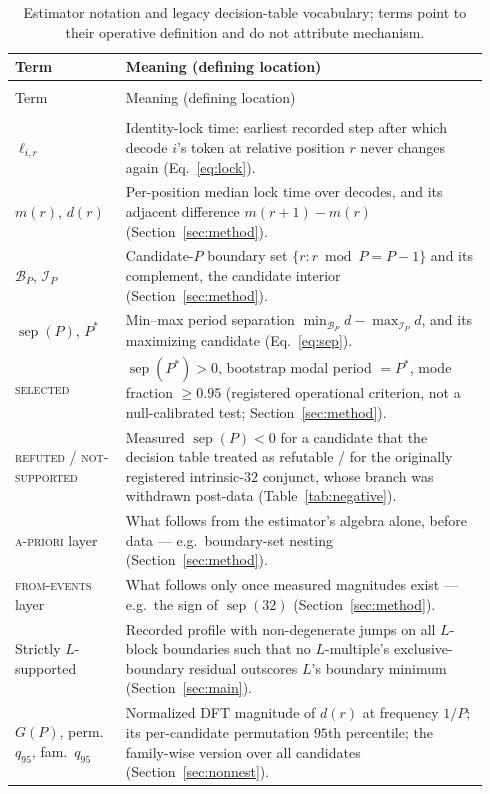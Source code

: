 \documentclass{article}
\begin{document}
\begingroup
\footnotesize
\setlength{\tabcolsep}{3pt}
\setlength{\LTpre}{3pt}
\setlength{\LTpost}{6pt}
\FloatBarrier
\begin{longtable}{@{}>{\raggedright\arraybackslash}p{0.22\linewidth}
                       >{\raggedright\arraybackslash}p{0.72\linewidth}@{}}
\caption{Estimator notation and legacy decision-table vocabulary; terms point to
their operative definition and do not attribute mechanism.}\label{tab:glossary}\\
\toprule
Term & Meaning (defining location) \\
\midrule
\endfirsthead
\multicolumn{2}{@{}l}{\footnotesize\itshape Table~\thetable{} continued}\\
\toprule
Term & Meaning (defining location) \\
\midrule
\endhead
\midrule
\multicolumn{2}{r@{}}{\footnotesize\itshape Continued on next page}\\
\endfoot
\bottomrule
\endlastfoot
$\ell_{i,r}$ & Identity-lock time: earliest recorded step after which decode
$i$'s token at relative position $r$ never changes again (Eq.~\eqref{eq:lock}). \\
$m(r)$, $d(r)$ & Per-position median lock time over decodes, and its adjacent
difference $m(r{+}1)-m(r)$ (Section~\ref{sec:method}). \\
$\mathcal B_P$, $\mathcal I_P$ & Candidate-$P$ boundary set
$\{r:r\bmod P=P-1\}$ and its complement, the candidate interior
(Section~\ref{sec:method}). \\
$\operatorname{sep}(P)$, $P^*$ & Min--max period separation
$\min_{\mathcal B_P}d-\max_{\mathcal I_P}d$, and its maximizing candidate
(Eq.~\eqref{eq:sep}). \\
\textsc{selected} & $\operatorname{sep}(P^*)>0$, bootstrap modal period $=P^*$,
mode fraction $\ge0.95$ (registered operational criterion, not a
null-calibrated test; Section~\ref{sec:method}). \\
\textsc{refuted} / \textsc{not-supported} & Measured $\operatorname{sep}(P)<0$
for a candidate that the decision table treated as refutable / for the
originally registered intrinsic-$32$ conjunct, whose branch was withdrawn
post-data (Table~\ref{tab:negative}). \\
\textsc{a-priori} layer & What follows from the estimator's algebra alone,
before data --- e.g.\ boundary-set nesting (Section~\ref{sec:method}). \\
\textsc{from-events} layer & What follows only once measured magnitudes exist ---
e.g.\ the sign of $\operatorname{sep}(32)$ (Section~\ref{sec:method}). \\
Strictly $L$-supported & Recorded profile with non-degenerate jumps on all
$L$-block boundaries such that no $L$-multiple's exclusive-boundary residual
outscores $L$'s boundary minimum (Section~\ref{sec:main}). \\
$G(P)$, perm.\ $q_{95}$, fam.\ $q_{95}$ & Normalized DFT magnitude of $d(r)$ at
frequency $1/P$; its per-candidate permutation $95$th percentile; the
family-wise version over all candidates (Section~\ref{sec:nonnest}). \\
\end{longtable}
\endgroup
\end{document}
